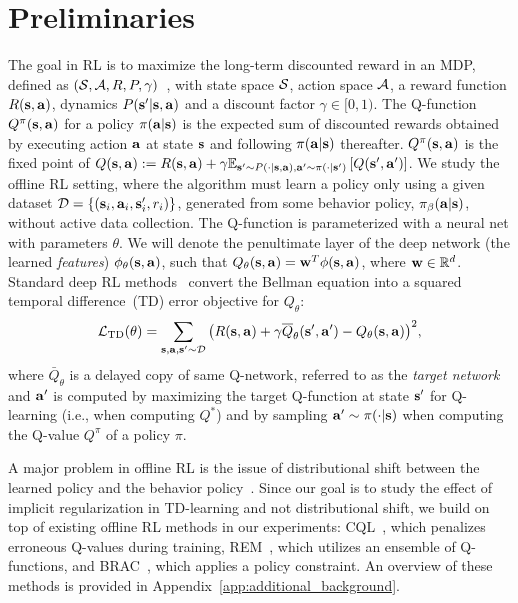 \vspace{-0.2cm}
\section{Preliminaries}
\vspace{-0.2cm}
\label{sec:background}
The goal in RL is to maximize the long-term discounted reward in an MDP, defined as $(\mathcal{S}, \mathcal{A}, R, P, \gamma)$~\citep{puterman1994markov}, with state space $\mathcal{S}$, action space $\mathcal{A}$, a reward function $R(\mathbf{s}, \mathbf{a})$, dynamics $P(\mathbf{s}' | \mathbf{s}, \mathbf{a})$ and a discount factor $\gamma \in [0, 1)$. The Q-function $Q^\pi(\mathbf{s}, \mathbf{a})$ for a policy $\pi(\mathbf{a}|\mathbf{s})$ is the expected sum of discounted rewards obtained by executing action $\mathbf{a}$ at state $\mathbf{s}$ and following $\pi(\mathbf{a}|\mathbf{s})$ thereafter.
$Q^\pi(\mathbf{s}, \mathbf{a})$ is the fixed point of $Q(\mathbf{s}, \mathbf{a}) := R(\mathbf{s}, \mathbf{a}) + \gamma \mathbb{E}_{\mathbf{s}' \sim P(\cdot|\mathbf{s}, \mathbf{a}), \mathbf{a}' \sim \pi(\cdot|\mathbf{s}')} \left[ Q(\mathbf{s}', \mathbf{a}')\right]$. We study the offline RL setting, where the algorithm must learn a policy only using a given dataset $\mathcal{D} = \{(\mathbf{s}_i, \mathbf{a}_i, \mathbf{s}'_i, r_i)\}$, generated from some behavior policy, ${\pi_\beta}(\mathbf{a}|\mathbf{s})$, without active data collection. The Q-function is parameterized with a neural net with parameters $\theta$. We will denote the penultimate layer of the deep network (the learned \emph{features}) $\phi_\theta(\mathbf{s}, \mathbf{a})$,
such that $Q_\theta(\mathbf{s}, \mathbf{a}) = \mathbf{w}^T \phi(\mathbf{s}, \mathbf{a})$, 
where $\mathbf{w} \in \mathbb{R}^{d}$. Standard deep RL methods~\citep{Mnih2015,Haarnoja18} convert the Bellman equation into a squared temporal difference~(TD) error objective for $Q_\theta$:
\begin{align}
\label{eqn:td_error}
 \small{\mathcal{L}_\mathrm{TD}(\theta) = \sum_{\bs, \ba, \bs' \sim \mathcal{D}} \left(R(\bs, \ba) + \gamma \overline{Q}_\theta(\bs', \ba') - Q_\theta(\bs, \ba) \right)^2},   
\end{align}
where $\bar{Q}_\theta$ is a delayed copy of same Q-network, referred to as the \emph{target network} and $\mathbf{a}'$ is computed by maximizing the target Q-function at state $\mathbf{s}'$ for Q-learning (i.e., when computing $Q^*$) and by sampling $\mathbf{a}' \sim \pi(\cdot|\mathbf{s})$ when computing the Q-value $Q^\pi$ of a policy $\pi$.  

A major problem in offline RL is the issue of distributional shift between the learned policy and the behavior policy~\citep{levine2020offline}. Since our goal is to study the effect of implicit regularization in TD-learning and not distributional shift, we build on top of existing offline RL methods in our experiments: CQL~\citep{kumar2020conservative}, which penalizes erroneous Q-values during training, REM~\citep{agarwal2019optimistic}, which utilizes an ensemble of Q-functions, and BRAC~\citep{wu2019behavior}, which applies a policy constraint. An overview of these methods is provided in Appendix~\ref{app:additional_background}. 

